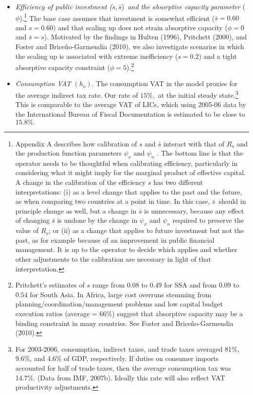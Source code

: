 \documentclass[11pt]{article}
\begin{document}
\begin{itemize}
\item \textit{Efficiency of public investment (}$s,\bar{s}$)\textit{\ and
the absorptive capacity parameter }($\phi $).\footnote{%
Appendix A describes how calibration of $s$ and $\bar{s}$ interact with that
of $R_{o}$ and the production function parameters $\psi _{x}$ and $\psi _{n}$%
. The bottom line is that the operator needs to be thoughtful when
calibrating efficiency, particularly in considering what it might imply for
the marginal product of effective capital. A change in the calibration of
the efficiency $s$ has two different interpretations: (i) as a level change
that applies to the past and the future, as when comparing two countries at
a point in time. In this case, $\bar{s}$\ should in principle change as
well, but a change in $\bar{s}$ is unnecessary, because any effect of
changing $\bar{s}$ is undone by the change in $\psi _{x}$ and $\psi _{n}$
required to preserve the value of $R_{o}$; or (ii) as a change that applies
to future investment but not the past, as for example because of an
improvement in public financial management. It is up to the operator to
decide which applies and whether other adjustments to the calibration are
necessary in light of that interpretation.} The base case assumes that
investment is somewhat efficient ($\bar{s}=0.60$ and $s=0.60)$ and that
scaling up does not strain absorptive capacity ($\phi =0$ and $\bar{s}=s$).
Motivated by the findings in Hulten (1996), Pritchett (2000), and Foster and
Brice\~{n}o-Garmendia (2010), we also investigate scenarios in which the
scaling up is associated with extreme inefficiency ($s=0.2$) and a tight
absorptive capacity constraint ($\phi =5$).\footnote{%
Pritchett's estimates of $s$ range from $0.08$ to $0.49$ for SSA and from $%
0.09$ to $0.54$ for South Asia. In Africa, large cost overruns stemming from
planning/coordination/management problems and low capital budget execution
ratios (average = $66\%$) suggest that absorptive capacity may be a binding
constraint in many countries. See Foster and Brice\~{n}o-Garmendia (2010).}

\item \textit{Consumption VAT }$(h_{o})$. The consumption VAT in the model
proxies for the average indirect tax rate. Our rate of $15\%,$ at the
initial steady state.\footnote{%
For 2003-2006, consumption, indirect taxes, and trade taxes averaged 81\%,
9.6\%, and 4.6\% of GDP, respectively. If duties on consumer imports
accounted for half of trade taxes, then the average consumption tax was
14.7\%. (Data from IMF, 2007b). Ideally this rate will also reflect VAT
productivity adjustments.} This is comparable to the average VAT of LICs,
which using 2005-06 data by the International Bureau of Fiscal Documentation
is estimated to be close to $15.8\%.$


\end{itemize}
\end{document}
